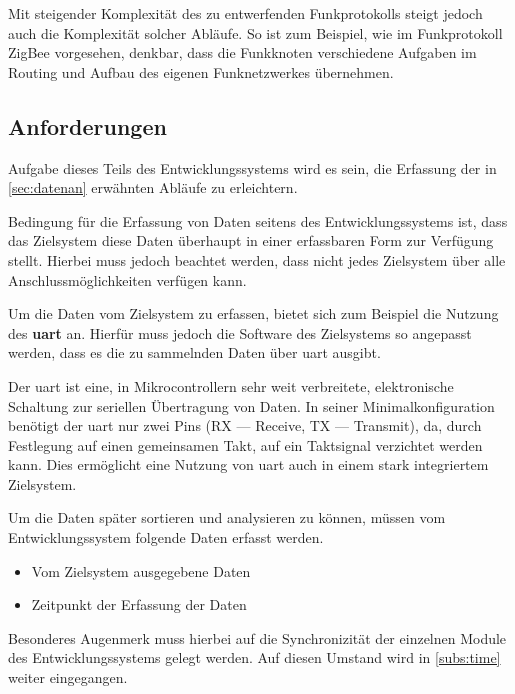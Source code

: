 Mit steigender Komplexität des zu
entwerfenden Funkprotokolls steigt jedoch auch die Komplexität solcher Abläufe.
So ist zum Beispiel, wie im Funkprotokoll ZigBee vorgesehen, denkbar, dass die
Funkknoten verschiedene Aufgaben im Routing und Aufbau des eigenen
Funknetzwerkes übernehmen.

\subsection{Anforderungen}
Aufgabe dieses Teils des Entwicklungssystems wird es sein, die Erfassung der in
\autoref{sec:datenan} erwähnten Abläufe zu erleichtern.

Bedingung für die Erfassung von Daten seitens des Entwicklungssystems ist, dass
das Zielsystem diese Daten überhaupt in einer erfassbaren Form zur Verfügung
stellt. Hierbei muss jedoch beachtet werden, dass nicht jedes Zielsystem über
alle Anschlussmöglichkeiten verfügen kann.

Um die Daten vom Zielsystem zu erfassen, bietet sich zum Beispiel die Nutzung
des \textbf{\gls{uart}} an. Hierfür muss jedoch die Software des Zielsystems so
angepasst werden, dass es die zu sammelnden Daten über \gls{uart} ausgibt.

\begin{definition}[UART]
Der \gls{uart} ist eine, in Mikrocontrollern sehr weit verbreitete,
elektronische Schaltung zur seriellen Übertragung von Daten. In
seiner Minimalkonfiguration benötigt der \gls{uart} nur zwei Pins (RX ---
Receive, TX --- Transmit), da, durch Festlegung auf einen gemeinsamen Takt, auf
ein Taktsignal verzichtet werden kann. Dies ermöglicht eine Nutzung von
\gls{uart} auch in einem stark integriertem Zielsystem.
\end{definition}

\begin{minipage}[c]{\textwidth}
Um die Daten später sortieren und analysieren zu können, müssen vom
Entwicklungssystem folgende Daten erfasst werden.
\begin{itemize}
  \item Vom Zielsystem ausgegebene Daten
  \item Zeitpunkt der Erfassung der Daten
\end{itemize}
\end{minipage}

Besonderes Augenmerk muss hierbei auf die Synchronizität der einzelnen Module
des Entwicklungssystems gelegt werden. Auf diesen Umstand wird in
\autoref{subs:time} weiter eingegangen. 

